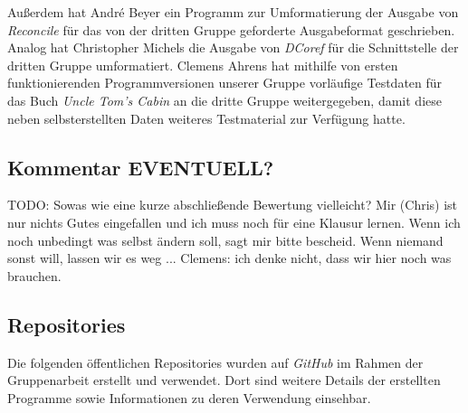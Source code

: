 \documentclass[a4paper,12pt,titlepage=true, ngerman]{scrartcl}
\begin{document}
Außerdem hat André Beyer ein Programm zur Umformatierung der Ausgabe von \emph{Reconcile} für das 
von der dritten Gruppe geforderte Ausgabeformat geschrieben. 
Analog hat Christopher Michels die Ausgabe von \emph{DCoref} für die Schnittstelle der dritten Gruppe umformatiert. 
Clemens Ahrens hat mithilfe von ersten funktionierenden Programmversionen unserer Gruppe vorläufige Testdaten 
für das Buch \emph{Uncle Tom's Cabin} \autocite[]{chris_uncle} an die dritte Gruppe weitergegeben, 
damit diese neben selbsterstellten Daten weiteres Testmaterial zur Verfügung hatte.


\subsection{Kommentar EVENTUELL?}\label{Kommentar}%

TODO: Sowas wie eine kurze abschließende Bewertung vielleicht? 
Mir (Chris) ist nur nichts Gutes eingefallen und ich muss noch für eine Klausur lernen. 
Wenn ich noch unbedingt was selbst ändern soll, sagt mir bitte bescheid. 
Wenn niemand sonst will, lassen wir es weg ...
Clemens: ich denke nicht, dass wir hier noch was brauchen.



\subsection{Repositories}\label{Repositories}%

Die folgenden öffentlichen Repositories wurden auf \emph{GitHub} \autocite[]{chris_github} im Rahmen 
der Gruppenarbeit erstellt und verwendet. 
Dort sind weitere Details der erstellten Programme sowie Informationen zu deren Verwendung einsehbar.
\end{document}
